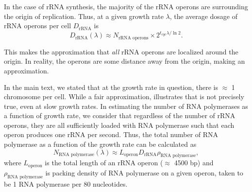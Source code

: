 In the case of rRNA synthesis,  the majority of the rRNA operons are surrounding
the origin of replication. Thus, at a given growth rate $\lambda$, the average
dosage of rRNA operons per cell $D_\text{rRNA}$ is
\begin{equation}
D_\text{rRNA}(\lambda) \approx N_\text{rRNA operons} \times 2^{t_{cyc} \lambda / \ln 2}.
\label{eq:rRNA_dosage}
\end{equation}

This makes the approximation that \textit{all} rRNA operons are localized around
the origin. In reality, the operons are some distance away from the origin,
making  an approximation.

In the main text, we stated that at the growth rate in question, there is
$\approx$ 1 chromosome per cell. While a fair approximation, 
illustrates that is not precisely true, even at slow growth rates. In estimating
the number of RNA polymerases as a function of growth rate, we consider that
regardless of the number of rRNA operons, they are all sufficiently loaded with
RNA polymerase such that each operon produces one rRNA per second. Thus, the
total number of RNA polymerase as a function of the growth rate can be
calculated as
\begin{equation}
    N_\text{RNA polymerase}(\lambda) \approx L_\text{operon}D_\text{rRNA}\rho_\text{RNA polymerase},
\end{equation}
where $L_\text{operon}$ is the total length of an rRNA operon ($\approx$ 4500
bp) and $\rho_\text{RNA polymerase}$ is packing density of RNA polymerase on a
given operon, taken to be 1 RNA polymerase per 80 nucleotides.
